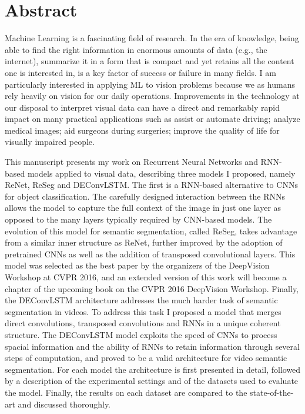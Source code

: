 \chapter*{Abstract}
Machine Learning is a fascinating field of research. In the era of knowledge,
being able to find the right information in enormous amounts of data (e.g., the
internet), summarize it in a form that is compact and yet retains all the
content one is interested in, is a key factor of success or failure in many
fields. I am particularly interested in applying ML to vision problems because
we as humans rely heavily on vision for our daily operations. Improvements in
the technology at our disposal to interpret visual data can have a direct and
remarkably rapid impact on many practical applications such as assist or
automate driving; analyze medical images; aid surgeons during surgeries;
improve the quality of life for visually impaired people.

This manuscript presents my work on Recurrent Neural Networks and RNN-based
models applied to visual data, describing three models I proposed, namely
ReNet, ReSeg and DEConvLSTM. The first is a RNN-based alternative to CNNs for
object classification. The carefully designed interaction between the RNNs
allows the model to capture the full context of the image in just one layer as
opposed to the many layers typically required by CNN-based models. The
evolution of this model for semantic segmentation, called ReSeg, takes
advantage from a similar inner structure as ReNet, further improved by the
adoption of pretrained CNNs as well as the addition of transposed convolutional
layers. This model was selected as the best paper by the organizers of the
DeepVision Workshop at CVPR 2016, and an extended version of this work will
become a chapter of the upcoming book on the CVPR 2016 DeepVision Workshop.
Finally, the DEConvLSTM architecture addresses the much harder task of semantic
segmentation in videos. To address this task I proposed a model that merges
direct convolutions, transposed convolutions and RNNs in a unique coherent
structure. The DEConvLSTM model exploits the speed of CNNs to process spacial
information and the ability of RNNs to retain information through several steps
of computation, and proved to be a valid architecture for video semantic
segmentation. For each model the architecture is first presented in detail,
followed by a description of the experimental settings and of the datasets used
to evaluate the model. Finally, the results on each dataset are compared to the
state-of-the-art and discussed thoroughly.
